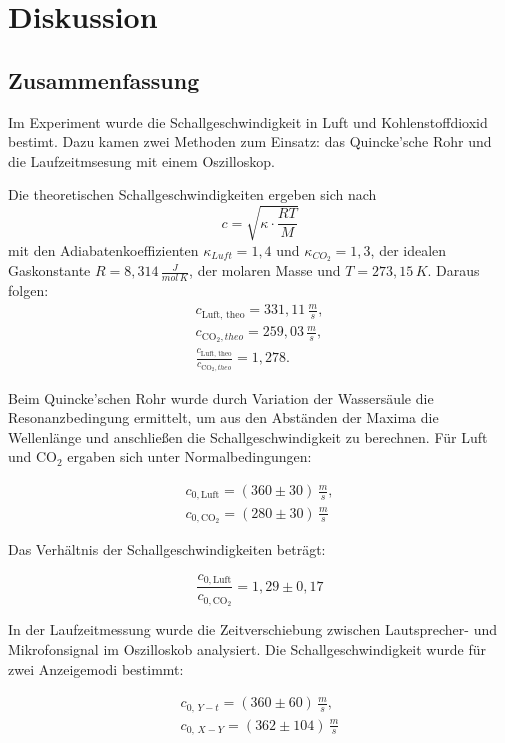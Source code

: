 \chapter{Diskussion}
\label{Disskusion}

\section{Zusammenfassung}

Im Experiment wurde die Schallgeschwindigkeit in Luft und Kohlenstoffdioxid bestimt. Dazu kamen zwei Methoden zum Einsatz: das Quincke'sche Rohr und die Laufzeitmsesung mit einem Oszilloskop. 

Die theoretischen Schallgeschwindigkeiten ergeben sich nach
\[
c = \sqrt{\kappa \cdot \frac{R T}{M}}
\]
mit den Adiabatenkoeffizienten $\kappa_{Luft}=1{,}4$ und $\kappa_{CO_2}=1{,}3$, der idealen Gaskonstante $R = 8{,}314\,\frac{J}{mol\,K}$, der molaren Masse und $T=273{,}15\,K$. Daraus folgen:
\begin{align}
    \boxed{c_{\text{Luft, theo}} = 331{,}11\,\frac{m}{s}}, \\ 
    \boxed{c_{\text{CO}_2, theo} = 259{,}03\,\frac{m}{s}}, \\ 
    \boxed{\frac{c_{\text{Luft, theo}}}{c_{\text{CO}_2, theo}} = 1{,}278.}
\end{align}

Beim Quincke'schen Rohr wurde durch Variation der Wassersäule die Resonanzbedingung ermittelt, um aus den Abständen der Maxima die Wellenlänge und anschließen die Schallgeschwindigkeit zu berechnen. Für Luft und CO$_2$ ergaben sich unter Normalbedingungen:

\begin{align}
    \boxed{c_{0,\text{Luft}} = (360 \pm 30)\,\frac{m}{s}}, \\ 
    \boxed{c_{0,\text{CO}_2} = (280 \pm 30)\,\frac{m}{s}}
\end{align}

Das Verhältnis der Schallgeschwindigkeiten beträgt:

\begin{equation}
    \boxed{\frac{c_{0,\text{Luft}}}{c_{0,\text{CO}_2}} = 1{,}29 \pm 0{,}17}
\end{equation}

In der Laufzeitmessung wurde die Zeitverschiebung zwischen Lautsprecher- und Mikrofonsignal im Oszilloskob analysiert. Die Schallgeschwindigkeit wurde für zwei Anzeigemodi bestimmt:

\begin{align}
    \boxed{c_{0,\,Y\!-\!t} = (360 \pm 60)\,\frac{m}{s}}, \\ 
    \boxed{c_{0,\,X\!-\!Y} = (362 \pm 104)\,\frac{m}{s}}
\end{align}

